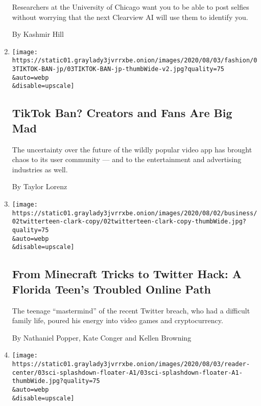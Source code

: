 \begin{enumerate}
  Researchers at the University of Chicago want you to be able to post
  selfies without worrying that the next Clearview AI will use them to
  identify you.

  By Kashmir Hill
\item
  \href{/2020/08/02/style/tiktok-ban-threat-trump.html}{}

  \texttt{[image: https://static01.graylady3jvrrxbe.onion/images/2020/08/03/fashion/03TIKTOK-BAN-jp/03TIKTOK-BAN-jp-thumbWide-v2.jpg?quality=75\\\&auto=webp\\\&disable=upscale]}

  \hypertarget{tiktok-ban-creators-and-fans-are-big-mad}{%
  \subsection{TikTok Ban? Creators and Fans Are Big
  Mad}\label{tiktok-ban-creators-and-fans-are-big-mad}}

  The uncertainty over the future of the wildly popular video app has
  brought chaos to its user community --- and to the entertainment and
  advertising industries as well.

  By Taylor Lorenz
\item
  \href{/2020/08/02/technology/florida-teenager-twitter-hack.html}{}

  \texttt{[image: https://static01.graylady3jvrrxbe.onion/images/2020/08/02/business/02twitterteen-clark-copy/02twitterteen-clark-copy-thumbWide.jpg?quality=75\\\&auto=webp\\\&disable=upscale]}

  \hypertarget{from-minecraft-tricks-to-twitter-hack-a-florida-teens-troubled-online-path}{%
  \subsection{From Minecraft Tricks to Twitter Hack: A Florida Teen's
  Troubled Online
  Path}\label{from-minecraft-tricks-to-twitter-hack-a-florida-teens-troubled-online-path}}

  The teenage ``mastermind'' of the recent Twitter breach, who had a
  difficult family life, poured his energy into video games and
  cryptocurrency.

  By Nathaniel Popper, Kate Conger and Kellen Browning
\item
  \href{/2020/08/02/science/spacex-astronauts-splashdown.html}{}

  \texttt{[image: https://static01.graylady3jvrrxbe.onion/images/2020/08/03/reader-center/03sci-splashdown-floater-A1/03sci-splashdown-floater-A1-thumbWide.jpg?quality=75\\\&auto=webp\\\&disable=upscale]}


\end{enumerate}
